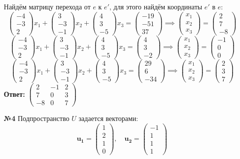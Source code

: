 \documentclass[a4paper]{article}
\newcommand{\mat}[1]{\begin{pmatrix} #1 \end{pmatrix}}
\begin{document}
\begin{enumerate}
    Найдём матрицу перехода от $e$ к $e'$, для этого найдём координаты $e'$ в $e$:
    $$
    \mat{-4\\-3\\2}x_1 + \mat{3\\-3\\-1}x_2 + \mat{4 \\ 3\\-5}x_3 = \mat{-19 \\-51\\37} \implies \mat{x_1 \\ x_2\\x_3} = \mat{2 \\ 7\\ -8}
    $$
    $$
    \mat{-4\\-3\\2}x_1 + \mat{3\\-3\\-1}x_2 + \mat{4 \\ 3\\-5}x_3 = \mat{4 \\ 3\\ -2} \implies \mat{x_1 \\ x_2\\x_3} = \mat{-1 \\ 0\\ 0}
    $$
    $$
    \mat{-4\\-3\\2}x_1 + \mat{3\\-3\\-1}x_2 + \mat{4 \\ 3\\-5}x_3 = \mat{29 \\ 6\\ -34} \implies \mat{x_1 \\ x_2\\x_3} = \mat{2 \\ 3\\ 7}
    $$
    \textbf{Ответ:} $\begin{pmatrix}2 & -1 & 2 \\ 7 & 0 & 3 \\ -8 & 0 & 7\end{pmatrix}$\\

    \item[\textbf{№4}]
    Подпространство $ U $ задается векторами:
    $$
    \mathbf{u_1} = \begin{pmatrix} 1 \\ 2 \\ 1 \\ 0 \end{pmatrix}, \quad \mathbf{u_2} = \begin{pmatrix} -1 \\ 1 \\ 1 \\ 1 \end{pmatrix}
    $$


\end{enumerate}
\end{document}
